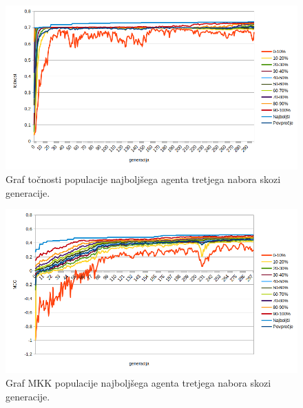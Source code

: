 \begin{figure}[H]
    \begin{center}
        \includegraphics[width=13cm]{car/3/acc}
    \end{center}
    \caption{Graf točnosti populacije najboljšega agenta tretjega nabora skozi generacije.}
    \label{fig:car_acc_3}
\end{figure}

\begin{figure}[H]
    \begin{center}
        \includegraphics[width=13cm]{car/3/mcc}
    \end{center}
    \caption{Graf MKK populacije najboljšega agenta tretjega nabora skozi generacije.}
    \label{fig:car_mcc_3}
\end{figure}

